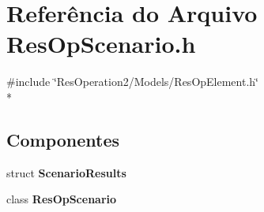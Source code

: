 \section{Referência do Arquivo Res\+Op\+Scenario.\+h}
\label{_res_op_scenario_8h}
{\ttfamily \#include \char`\"{}Res\+Operation2/\+Models/\+Res\+Op\+Element.\+h\char`\"{}}\\*
\subsection*{Componentes}
\begin{DoxyCompactItemize}
\item 
struct {\bf Scenario\+Results}
\item 
class {\bf Res\+Op\+Scenario}
\end{DoxyCompactItemize}
